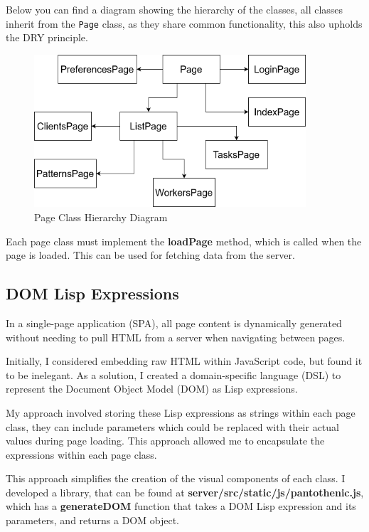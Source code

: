 Below you can find a diagram showing the hierarchy of the classes,
all classes inherit from the \texttt{Page} class,
as they share common functionality, this also upholds the DRY principle.

\begin{figure}[h!]
    \includegraphics[width=0.9\textwidth]{images/diagrams/dashboard_hierarchy.drawio}
    \caption{Page Class Hierarchy Diagram}
    \label{image:sysArchitecture}
\end{figure}

Each page class must implement the \textbf{loadPage} method,
which is called when the page is loaded.
This can be used for fetching data from the server.

\subsection{DOM Lisp Expressions}
In a single-page application (SPA), all page content
is dynamically generated without
needing to pull HTML from a server when navigating between pages.

Initially, I considered embedding raw HTML within JavaScript code,
but found it to be inelegant.
As a solution, I created a domain-specific language (DSL)
to represent the Document Object Model (DOM) as Lisp expressions.

My approach involved storing these Lisp expressions as strings within each page class,
they can include parameters which could be replaced with their actual values during page loading.
This approach allowed me to encapsulate the expressions within each page class.

This approach simplifies the creation of the visual components of each class.
I developed a library, that can be found at \textbf{server/src/static/js/pantothenic.js},
which has a \textbf{generateDOM} function that takes a
DOM Lisp expression and its parameters, and returns a DOM object.

